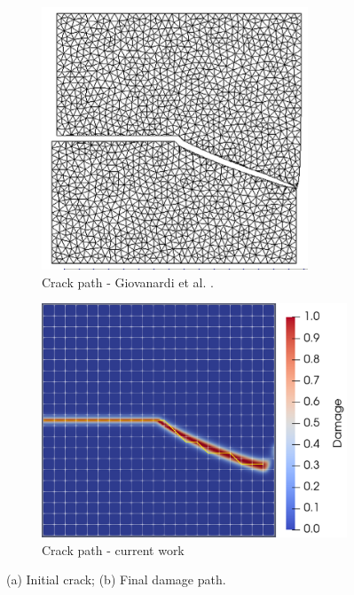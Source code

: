 \begin{figure}[h]
    \begin{subfigure}{.45\textwidth}
      \centering
      \includegraphics[width=0.765\linewidth]{Chapter4/figures/nonplanar/curved_crack_result_bianca.png}
      \caption{Crack path - Giovanardi et al. \cite{giovanardi2017hybrid}.}
      \label{fig:reference result}
    \end{subfigure}%
    \begin{subfigure}{.54\textwidth}
      \centering
      \includegraphics[width=0.83\linewidth]{Chapter4/figures/nonplanar/nonplanar_example.png}
      \caption{Crack path - current work}
      \label{fig:crack_path}
    \end{subfigure}%
      \caption{(a) Initial crack; (b) Final damage path.} 
      \label{fig:nonplanar_example}
\end{figure}